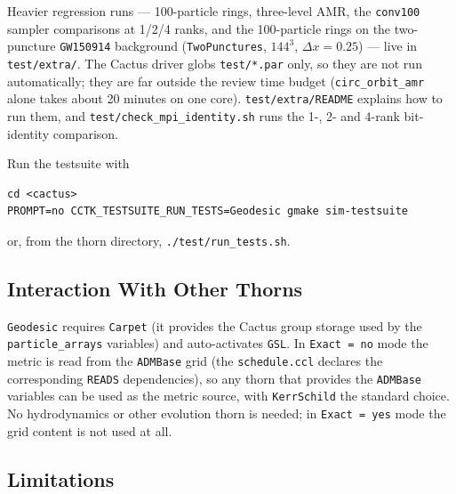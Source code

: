 \documentclass{article}
\begin{document}
Heavier regression runs --- 100-particle rings, three-level
AMR, the \texttt{conv100} sampler comparisons at 1/2/4 ranks, and the
100-particle rings on the two-puncture \texttt{GW150914} background
(\texttt{TwoPunctures}, $144^3$, $\Delta x = 0.25$) --- live in
\texttt{test/extra/}.  The Cactus driver globs \texttt{test/*.par} only,
so they are not run automatically; they are far outside the review time
budget (\texttt{circ\_orbit\_amr} alone takes about 20 minutes on one
core).  \texttt{test/extra/README} explains how to run them, and
\texttt{test/check\_mpi\_identity.sh} runs the 1-, 2- and 4-rank
bit-identity comparison.

Run the testsuite with
\begin{verbatim}
cd <cactus>
PROMPT=no CCTK_TESTSUITE_RUN_TESTS=Geodesic gmake sim-testsuite
\end{verbatim}
or, from the thorn directory, \texttt{./test/run\_tests.sh}.

\subsection{Interaction With Other Thorns}

\texttt{Geodesic} requires \texttt{Carpet} (it provides the Cactus
group storage used by the \texttt{particle\_arrays} variables) and
auto-activates \texttt{GSL}.
In \texttt{Exact = no} mode the metric is read from the
\texttt{ADMBase} grid (the \texttt{schedule.ccl} declares the
corresponding \texttt{READS} dependencies), so any thorn that
provides the \texttt{ADMBase} variables can be used as the metric
source, with \texttt{KerrSchild} the standard choice.  No
hydrodynamics or other evolution thorn is needed; in
\texttt{Exact = yes} mode the grid content is not used at all.

\subsection{Limitations}
\end{document}
